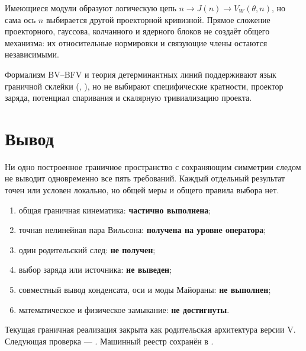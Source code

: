 Имеющиеся модули образуют логическую цепь
\(n\to J(n)\to V_W(\theta,n)\), но сама ось \(n\) выбирается другой
проекторной кривизной. Прямое сложение проекторного, гауссова, колчанного и
ядерного блоков не создаёт общего механизма: их относительные нормировки и
связующие члены остаются независимыми.

Формализм BV--BFV и теория детерминантных линий поддерживают язык граничной
склейки (, ), но не
выбирают специфические кратности, проектор заряда, потенциал спаривания и
скалярную тривиализацию проекта.

\section{Вывод}

\begin{theorem}
Ни одно построенное граничное пространство с сохраняющим симметрии следом не
выводит одновременно все пять требований. Каждый отдельный результат точен
или условен локально, но общей меры и общего правила выбора нет.
\end{theorem}

\begin{protocol}
\begin{enumerate}
 \item общая граничная кинематика: \textbf{частично выполнена};
 \item точная нелинейная пара Вильсона: \textbf{получена на уровне оператора};
 \item один родительский след: \textbf{не получен};
 \item выбор заряда или источника: \textbf{не выведен};
 \item совместный вывод конденсата, оси и моды Майораны:
 \textbf{не выполнен};
 \item математическое и физическое замыкание: \textbf{не достигнуты}.
\end{enumerate}
\end{protocol}

Текущая граничная реализация закрыта как родительская архитектура версии V.
Следующая проверка --- .
Машинный реестр сохранён в
.